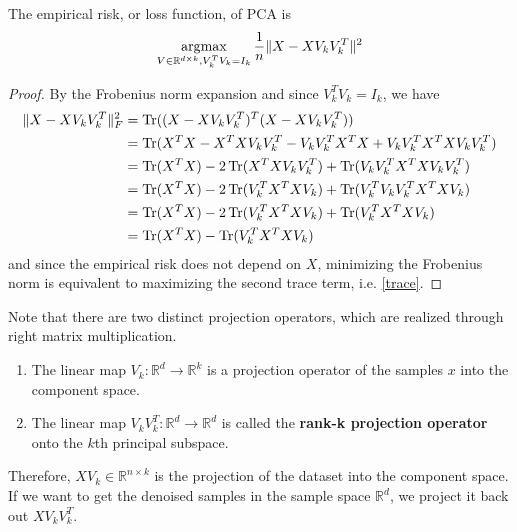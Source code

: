   \begin{theorem}
    The empirical risk, or loss function, of PCA is
    \begin{equation}
      \operatorname*{\arg\!\max}_{V \in \mathbb{R}^{d \times k}, V_k^T V_k = I_k} 
      \frac{1}{n} \| X - X V_k V_k^T\|^2
    \end{equation}
  \end{theorem} 
  \begin{proof}
    By the Frobenius norm expansion and since $V_k^T V_k = I_k$, we have 
    \begin{align}
      \|X - X V_k V_k^T\|_F^2 
      & = \operatorname{Tr}((X - X V_k V_k^T)^T(X - X V_k V_k^T)) \\
      & = \operatorname{Tr}(X^T X - X^T X V_k V_k^T - V_k V_k^T X^T X + V_k V_k^T X^T X V_k V_k^T) \\
      & = \operatorname{Tr}(X^T X) - 2\operatorname{Tr}(X^T X V_k V_k^T) + \operatorname{Tr}(V_k V_k^T X^T X V_k V_k^T) \\ 
      & = \operatorname{Tr}(X^T X) - 2\operatorname{Tr}(V_k^T X^T X V_k) + \operatorname{Tr}(V_k^T V_k V_k^T X^T X V_k) \\
      & = \operatorname{Tr}(X^T X) - 2\operatorname{Tr}(V_k^T X^T X V_k) + \operatorname{Tr}(V_k^T X^T X V_k) \\ 
      & = \operatorname{Tr}(X^T X) - \operatorname{Tr}(V_k^T X^T X V_k) 
    \end{align}
    and since the empirical risk does not depend on $X$, minimizing the Frobenius norm is equivalent to maximizing the second trace term, i.e. \ref{trace}. 
  \end{proof}

  \begin{definition}
    Note that there are two distinct projection operators, which are realized through right matrix multiplication. 
    \begin{enumerate}
      \item The linear map $V_k : \mathbb{R}^d \to \mathbb{R}^k$ is a projection operator of the samples $x$ into the component space. 
      \item The linear map $V_k V_k^T : \mathbb{R}^d \to \mathbb{R}^d$ is called the \textbf{rank-k projection operator} onto the $k$th principal subspace. 
    \end{enumerate}
  \end{definition}

  Therefore, $X V_k \in \mathbb{R}^{n \times k}$ is the projection of the dataset into the component space. If we want to get the denoised samples in the sample space $\mathbb{R}^d$, we project it back out $X V_k V_k^T$. 


